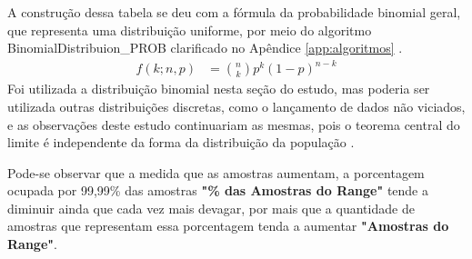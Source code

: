 A construção dessa tabela se deu com a fórmula da probabilidade binomial geral, que representa uma distribuição uniforme, por meio do algoritmo BinomialDistribuion\_PROB clarificado no Apêndice \ref{app:algoritmos} \cite{mathisfun_binomial_distribution}.
	\begin{align*}
	f(k;n,p) &= \binom{n}{k} p^k(1 - p)^{n-k}
	\end{align*}
Foi utilizada a distribuição binomial nesta seção do estudo, mas poderia ser utilizada outras distribuições discretas, como o lançamento de dados não viciados, e as observações deste estudo continuariam as mesmas, pois o teorema central do limite é independente da forma da distribuição da população \cite{statisticsbyjim_central_limite_theorem_explainded}.

Pode-se observar que a medida que as amostras aumentam, a porcentagem ocupada por 99,99\% das amostras \textbf{"\% das Amostras do Range"} tende a diminuir ainda que cada vez mais devagar, por mais que a quantidade de amostras que representam essa porcentagem tenda a aumentar \textbf{"Amostras do Range"}.

